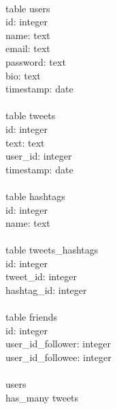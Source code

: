 \documentclass{article}
\begin{document}
	\hspace{0cm}
	\\
	table users \\
	\indent id: integer \\
	\indent name: text \\
	\indent email: text \\
	\indent password: text \\
	\indent bio: text \\
	\indent timestamp: date \\
	\\
	table tweets \\
	\indent id: integer \\
	\indent text: text \\
	\indent user\_id: integer \\
	\indent timestamp: date \\
	\\
	table hashtags \\
	\indent id: integer \\
	\indent name: text \\
	\\
	table tweets\_hashtags \\
	\indent id: integer \\
	\indent tweet\_id: integer \\
	\indent hashtag\_id: integer \\
	\\
	table friends \\
	\indent id: integer \\
	\indent user\_id\_follower: integer \\
	\indent user\_id\_followee: integer \\
	\\
	users \\
	\indent has\_many tweets
	
\end{document}
